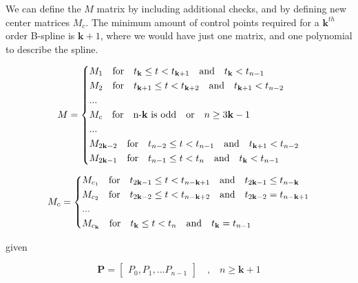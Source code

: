 \documentclass{article}
\begin{document}
We can define the \(M\) matrix by including additional checks, and by defining new center matrices \(M_c\). The minimum amount of control points required for a \(\textbf{k}^{th}\) order B-spline is \(\textbf{k}+1\), where we would have just one matrix, and one polynomial to describe the spline.

\begin{equation} 
        M = \begin{dcases} 
            M_{1} \quad \text{for} \quad t_{\textbf{k}} \leq t < t_{\textbf{k}+1} \quad \text{and} \quad t_\textbf{k} < t_{n-1} \\
            M_{2} \quad \text{for} \quad t_{\textbf{k}+1} \leq t < t_{\textbf{k}+2} \quad \text{and} \quad t_{\textbf{k}+1} < t_{n-2} \\
            ...\\
            M_{c} \quad \text{for} \quad \text{n-\textbf{k} is odd} \quad \text{or} \quad n \geq 3\textbf{k}-1 \\
            ...\\
            M_{2\textbf{k}-2} \quad \text{for} \quad t_{n-2} \leq t < t_{n-1} \quad \text{and} \quad t_{\textbf{k}+1} < t_{n-2}\\
            M_{2\textbf{k}-1} \quad \text{for} \quad t_{n-1} \leq t < t_{n} \quad \text{and} \quad t_\textbf{k} < t_{n-1}
        \end{dcases}
\end{equation}

\begin{equation} 
        M_c = \begin{dcases} 
            M_{c_1} \quad \text{for} \quad t_{2\textbf{k}-1} \leq t < t_{n-\textbf{k}+1} \quad \text{and} \quad t_{2\textbf{k}-1} \leq  t_{n-\textbf{k}}\\
            M_{c_2} \quad \text{for} \quad t_{2\textbf{k}-2} \leq t < t_{n-\textbf{k}+2} \quad \text{and} \quad t_{2\textbf{k}-2} = t_{n-\textbf{k}+1}\\
            ...\\
            M_{c_\textbf{k}} \quad \text{for} \quad t_{\textbf{k}} \leq t < t_{n} \quad \text{and} \quad t_\textbf{k} = t_{n-1}
        \end{dcases}
\end{equation}

given

    \begin{equation}
        \textbf{P} = \begin{bmatrix} P_0, P_1, ... P_{n-1} \end{bmatrix} \quad \text{,} \quad n \geq \textbf{k}+1
    \end{equation}
    
\end{document}
